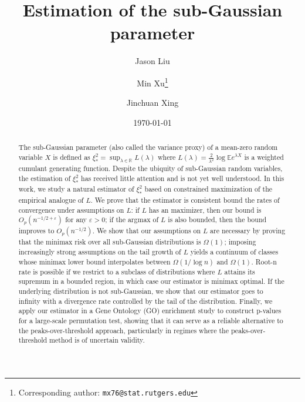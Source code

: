 \documentclass{article}
\title{Estimation of the sub-Gaussian parameter}
\author[1]{Jason Liu}
\author[1]{Min Xu\thanks{Corresponding author: \texttt{mx76@stat.rutgers.edu}}}
\author[2]{Jinchuan Xing}
\affil[1]{Department of Statistics, Rutgers University}
\affil[2]{Department of Genetics, Rutgers University}
\date{\today}
\theoremstyle{definition}
\newcommand{\1}{\mathbbm{1}}
\begin{document}
\maketitle


\begin{abstract}

The sub-Gaussian parameter (also called the variance proxy) of a mean-zero random variable $X$ is defined as $\xi^2_* = \sup_{\lambda \in \mathbb{R}} L(\lambda)$ where $L(\lambda) = \frac{2}{\lambda^2} \log \mathbb{E} e^{\lambda X}$ is a weighted cumulant generating function. Despite the ubiquity of sub-Gaussian random variables, the estimation of $\xi^2_*$ has received little attention and is not yet well understood. In this work, we study a natural estimator of $\xi^2_*$ based on constrained maximization of the empirical analogue of $L$. We prove that the estimator is consistent bound the rates of convergence under assumptions on $L$: if $L$ has an maximizer, then our bound is $O_p(n^{-1/2 + \varepsilon})$ for any $\varepsilon > 0$; if the argmax of $L$ is also bounded, then the bound improves to $O_p(n^{-1/2})$. We show that our assumptions on $L$ are necessary by proving that the minimax risk over all sub-Gaussian distributions is $\Omega(1)$; imposing increasingly strong assumptions on the tail growth of $L$ yields a continuum of classes whose minimax lower bound interpolates between $\Omega(1/\log n)$ and $\Omega(1)$. Root-n rate is possible if we restrict to a subclass of distributions where $L$ attains its supremum in a bounded region, in which case our estimator is minimax optimal. If the underlying distribution is not sub-Gaussian, we show that our estimator goes to infinity with a divergence rate controlled by the tail of the distribution. Finally, we apply our estimator in a Gene Ontology (GO) enrichment study to construct p-values for a large-scale permutation test, showing that it can serve as a reliable alternative to the peaks-over-threshold approach, particularly in regimes where the peaks-over-threshold method is of uncertain validity.



\end{abstract}
\end{document}
